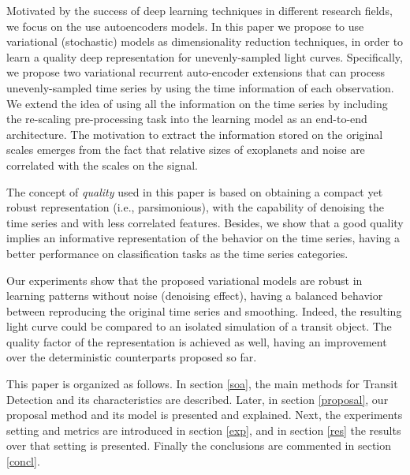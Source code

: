 Motivated by the success of deep learning techniques \citep{surveyDL2017} in different research fields, we focus on the use autoencoders models. %
In this paper we propose to use variational (stochastic) models as dimensionality reduction techniques, in order to learn a quality deep representation for unevenly-sampled light curves. 
Specifically, we propose two variational recurrent auto-encoder extensions that can process unevenly-sampled time series by using the time information of each observation. 
We extend the idea of using all the information on the time series by including the re-scaling pre-processing task into the learning model as an end-to-end architecture.
The motivation to extract the information stored on the original scales emerges from the fact that relative sizes of exoplanets and noise are correlated with the scales on the signal.

The concept of \textit{quality} used in this paper is based on obtaining a compact yet robust representation (i.e., parsimonious), with the capability of denoising the time series and with less correlated features. Besides, we show that a good quality implies an informative representation of the behavior on the time series, having a better performance on classification tasks as the time series categories.

Our experiments show that the proposed variational models are robust in learning patterns without noise (denoising effect), having a balanced behavior between reproducing the original time series and smoothing. Indeed, the resulting light curve could be compared to an isolated simulation of a transit object. 
The quality factor of the representation is achieved as well, having an improvement over the deterministic counterparts proposed so far.

This paper is organized as follows. In section \ref{soa}, the main methods for Transit Detection and its characteristics are described. Later, in section \ref{proposal}, our proposal method and its model is presented and explained. Next, the experiments setting and metrics are introduced in section \ref{exp}, and in section \ref{res} the results over that setting is presented. Finally the conclusions are commented in section \ref{concl}. 

